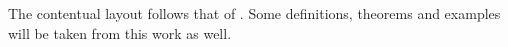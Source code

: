 The contentual layout follows that of \cite{PLM_UCTHESIS_03}. Some definitions, theorems and examples will be taken from this work as well.



